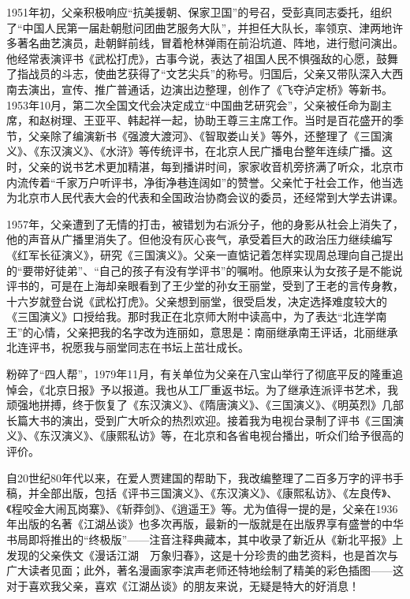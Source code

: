 \documentclass[12pt,UTF8]{ctexbook}
\begin{document}
1951年初，父亲积极响应“抗美援朝、保家卫国”的号召，受彭真同志委托，组织了“中国人民第一届赴朝慰问团曲艺服务大队”，并担任大队长，率领京、津两地许多著名曲艺演员，赴朝鲜前线，冒着枪林弹雨在前沿坑道、阵地，进行慰问演出。他经常表演评书《武松打虎》，古事今说，表达了祖国人民不惧强敌的心愿，鼓舞了指战员的斗志，使曲艺获得了“文艺尖兵”的称号。归国后，父亲又带队深入大西南去演出，宣传、推广普通话，边演出边整理，创作了《飞夺泸定桥》等新书。1953年10月，第二次全国文代会决定成立“中国曲艺研究会”，父亲被任命为副主席，和赵树理、王亚平、韩起祥一起，协助王尊三主席工作。当时是百花盛开的季节，父亲除了编演新书《强渡大渡河》、《智取娄山关》等外，还整理了《三国演义》、《东汉演义》、《水浒》等传统评书，在北京人民广播电台整年连续广播。这时，父亲的说书艺术更加精湛，每到播讲时间，家家收音机旁挤满了听众，北京市内流传着“千家万户听评书，净街净巷连阔如”的赞誉。父亲忙于社会工作，他当选为北京市人民代表大会的代表和全国政治协商会议的委员，还经常到大学去讲课。

1957年，父亲遭到了无情的打击，被错划为右派分子，他的身影从社会上消失了，他的声音从广播里消失了。但他没有灰心丧气，承受着巨大的政治压力继续编写《红军长征演义》，研究《三国演义》。父亲一直惦记着怎样实现周总理向自己提出的“要带好徒弟”、“自己的孩子有没有学评书”的嘱咐。他原来认为女孩子是不能说评书的，可是在上海却亲眼看到了王少堂的孙女王丽堂，受到了王老的言传身教，十六岁就登台说《武松打虎》。父亲想到丽堂，很受启发，决定选择难度较大的《三国演义》口授给我。那时我正在北京师大附中读高中，为了表达“北连学南王”的心情，父亲把我的名字改为连丽如，意思是：南丽继承南王评话，北丽继承北连评书，祝愿我与丽堂同志在书坛上茁壮成长。

粉碎了“四人帮”，1979年11月，有关单位为父亲在八宝山举行了彻底平反的隆重追悼会，《北京日报》予以报道。我也从工厂重返书坛。为了继承连派评书艺术，我顽强地拼搏，终于恢复了《东汉演义》、《隋唐演义》、《三国演义》、《明英烈》几部长篇大书的演出，受到广大听众的热烈欢迎。接着我为电视台录制了评书《三国演义》、《东汉演义》、《康熙私访》等，在北京和各省电视台播出，听众们给予很高的评价。

自20世纪80年代以来，在爱人贾建国的帮助下，我改编整理了二百多万字的评书手稿，并全部出版，包括《评书三国演义》、《东汉演义》、《康熙私访》、《左良传》、《程咬金大闹瓦岗寨》、《斩莽剑》、《逍遥王》等。尤为值得一提的是，父亲在1936年出版的名著《江湖丛谈》也多次再版，最新的一版就是在出版界享有盛誉的中华书局即将推出的“终极版”——注音注释典藏本，其中收录了新近从《新北平报》上发现的父亲佚文《漫话江湖　万象归春》，这是十分珍贵的曲艺资料，也是首次与广大读者见面；此外，著名漫画家李滨声老师还特地绘制了精美的彩色插图——这对于喜欢我父亲，喜欢《江湖丛谈》的朋友来说，无疑是特大的好消息！
\end{document}
